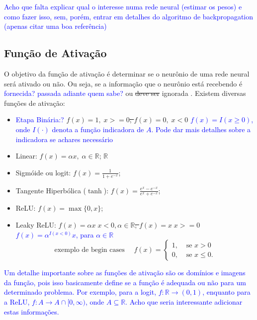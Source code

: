 \documentclass{automatextcc}
\newcommand{\pumi}[1]{\textcolor{blue}{#1}}
\newcommand{\R}{\mathds{R}}
\begin{document}

\pumi{Acho que falta explicar qual o interesse numa rede neural (estimar os pesos) e como fazer isso, sem, porém, entrar em detalhes do algoritmo de backpropagation (apenas citar uma boa referência)}
\subsection{Função de Ativação}
O objetivo da função de ativação é determinar se o neurônio de uma rede neural será ativado ou não. Ou seja, se a informação que o neurônio está recebendo é \pumi{fornecida? passada adiante quem sabe?} ou \sout{deve ser} ignorada \citep{dsa2021deeplearningbook}. Existem diversas funções de ativação:
\begin{itemize}
    \item \pumi{Etapa Binária:?} \sout{$f(x) = 1, \; x>=0$; $f(x) = 0, \; x<0$ } \pumi{$f(x)=I(x\geq 0)$, onde $I(\cdot)$ denota a função indicadora de $A$. Pode dar mais detalhes sobre a indicadora se achares necessário}
    \item Linear: $f(x) = \alpha x, \; \alpha \in\R$; \sout{$\mathbb{R}$}
    \item Sigmóide ou logit: $f(x) = \frac{1}{1+e^{-x}}$; 
    \item Tangente Hiperbólica ($\tanh$): $f(x) = \frac{e^{x}-e^{-x}}{e^{x}+e^{-x}}$;
    \item ReLU: $f(x) = \max\{0,x\}$;
    \item Leaky ReLU: \sout{$f(x) = \alpha x \; x<0, \alpha \in \mathbb{R}$; $f(x) = x \; x>=0$}\pumi{$f(x)=\alpha^{I(x<0)}x$, para $\alpha\in\R$}
    \[\mbox{exemplo de begin cases }\quad f(x)=\begin{cases}
    1, & \mbox{ se } x>0\\
    0, & \mbox{ se } x\leq 0.
    \end{cases}\]
\end{itemize}
\pumi{Um detalhe importante sobre as funções de ativação são os domínios e imagens da função, pois isso basicamente define se a função é adequada ou não para um determinado problema. Por exemplo, para a logit, $f:\R\rightarrow(0,1)$, enquanto para a ReLU, $f:A\rightarrow A\cap [0,\infty)$, onde $A\subseteq\R$. Acho que seria interessante adicionar estas informações.  }
\end{document}
